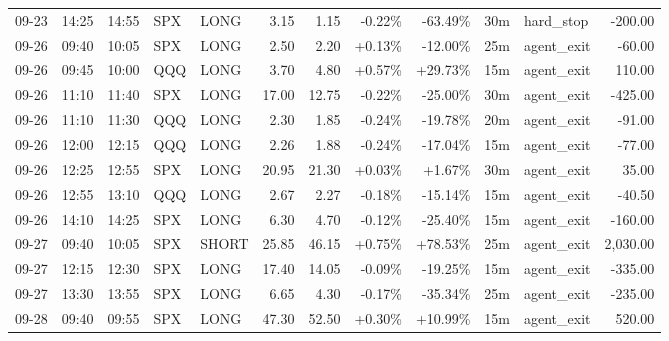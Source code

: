 \documentclass[11pt,a4paper]{article}
\begin{document}
\begin{center}
\begin{longtable}{>{\color{txtmain}}l l l l l r r r r r >{\color{txtmain}}l r}
09-23 & 14:25 & 14:55 & SPX & LONG & 3.15 & 1.15 & \textcolor{lossred}{-0.22\%} & \textcolor{lossred}{-63.49\%} & 30m & hard\_stop & \textcolor{lossred}{-200.00} \\
09-26 & 09:40 & 10:05 & SPX & LONG & 2.50 & 2.20 & \textcolor{wingreen}{+0.13\%} & \textcolor{lossred}{-12.00\%} & 25m & agent\_exit & \textcolor{lossred}{-60.00} \\
09-26 & 09:45 & 10:00 & QQQ & LONG & 3.70 & 4.80 & \textcolor{wingreen}{+0.57\%} & \textcolor{wingreen}{+29.73\%} & 15m & agent\_exit & \textcolor{wingreen}{110.00} \\
09-26 & 11:10 & 11:40 & SPX & LONG & 17.00 & 12.75 & \textcolor{lossred}{-0.22\%} & \textcolor{lossred}{-25.00\%} & 30m & agent\_exit & \textcolor{lossred}{-425.00} \\
09-26 & 11:10 & 11:30 & QQQ & LONG & 2.30 & 1.85 & \textcolor{lossred}{-0.24\%} & \textcolor{lossred}{-19.78\%} & 20m & agent\_exit & \textcolor{lossred}{-91.00} \\
09-26 & 12:00 & 12:15 & QQQ & LONG & 2.26 & 1.88 & \textcolor{lossred}{-0.24\%} & \textcolor{lossred}{-17.04\%} & 15m & agent\_exit & \textcolor{lossred}{-77.00} \\
09-26 & 12:25 & 12:55 & SPX & LONG & 20.95 & 21.30 & \textcolor{wingreen}{+0.03\%} & \textcolor{wingreen}{+1.67\%} & 30m & agent\_exit & \textcolor{wingreen}{35.00} \\
09-26 & 12:55 & 13:10 & QQQ & LONG & 2.67 & 2.27 & \textcolor{lossred}{-0.18\%} & \textcolor{lossred}{-15.14\%} & 15m & agent\_exit & \textcolor{lossred}{-40.50} \\
09-26 & 14:10 & 14:25 & SPX & LONG & 6.30 & 4.70 & \textcolor{lossred}{-0.12\%} & \textcolor{lossred}{-25.40\%} & 15m & agent\_exit & \textcolor{lossred}{-160.00} \\
09-27 & 09:40 & 10:05 & SPX & SHORT & 25.85 & 46.15 & \textcolor{wingreen}{+0.75\%} & \textcolor{wingreen}{+78.53\%} & 25m & agent\_exit & \textcolor{wingreen}{2,030.00} \\
09-27 & 12:15 & 12:30 & SPX & LONG & 17.40 & 14.05 & \textcolor{lossred}{-0.09\%} & \textcolor{lossred}{-19.25\%} & 15m & agent\_exit & \textcolor{lossred}{-335.00} \\
09-27 & 13:30 & 13:55 & SPX & LONG & 6.65 & 4.30 & \textcolor{lossred}{-0.17\%} & \textcolor{lossred}{-35.34\%} & 25m & agent\_exit & \textcolor{lossred}{-235.00} \\
09-28 & 09:40 & 09:55 & SPX & LONG & 47.30 & 52.50 & \textcolor{wingreen}{+0.30\%} & \textcolor{wingreen}{+10.99\%} & 15m & agent\_exit & \textcolor{wingreen}{520.00} \\

\end{longtable}
\end{center}
\end{document}
